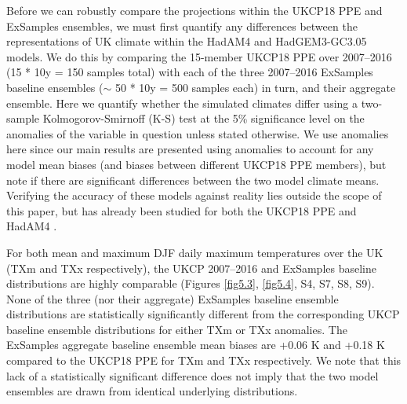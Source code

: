     Before we can robustly compare the projections within the UKCP18 PPE and ExSamples ensembles, we must first quantify any differences between the representations of UK climate within the HadAM4 and HadGEM3-GC3.05 models. We do this by comparing the 15-member UKCP18 PPE over 2007--2016 (15 * 10y = 150 samples total) with each of the three 2007--2016 ExSamples baseline ensembles ($\sim$ 50 * 10y = 500 samples each) in turn, and their aggregate ensemble. Here we quantify whether the simulated climates differ using a two-sample Kolmogorov-Smirnoff (K-S) test \citep{hodges_significance_1958,kolmogorov_sulla_1933,smirnoff_estimation_1939,smirnoff_sur_1939} at the 5\% significance level on the anomalies of the variable in question unless stated otherwise. We use anomalies here since our main results are presented using anomalies to account for any model mean biases (and biases between different UKCP18 PPE members), but note if there are significant differences between the two model climate means. Verifying the accuracy of these models against reality lies outside the scope of this paper, but has already been studied for both the UKCP18 PPE \citep{murphy_ukcp18_2018} and HadAM4 \citep{bevacqua_larger_2021,watson_multi-thousand_2020}.
    
    For both mean and maximum DJF daily maximum temperatures over the UK (TXm and TXx respectively), the UKCP 2007--2016 and ExSamples baseline distributions are highly comparable (Figures \ref{fig5.3}, \ref{fig5.4}, S4, S7, S8, S9). None of the three (nor their aggregate) ExSamples baseline ensemble distributions are statistically significantly different from the corresponding UKCP baseline ensemble distributions for either TXm or TXx anomalies. The ExSamples aggregate baseline ensemble mean biases are +0.06 K and +0.18 K compared to the UKCP18 PPE for TXm and TXx respectively. We note that this lack of a statistically significant difference does not imply that the two model ensembles are drawn from identical underlying distributions.
    
